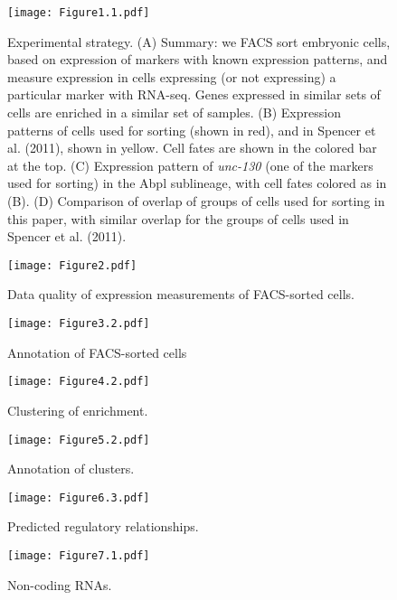 \documentclass{article}
\begin{document}

\begin{figure}
\texttt{[image: Figure1.1.pdf]}
\caption{Experimental strategy.
(A) Summary: we FACS sort embryonic cells, based on expression of markers with known expression patterns, and measure expression in cells expressing (or not expressing) a particular marker with RNA-seq. Genes expressed in similar sets of cells are enriched in a similar set of samples.
(B) Expression patterns of cells used for sorting (shown in red), and in Spencer et al. (2011), shown in yellow. Cell fates are shown in the colored bar at the
top.
(C) Expression pattern of {\em unc-130} (one of the markers used for sorting) in the Abpl sublineage, with cell fates colored as in (B).
(D) Comparison of overlap of groups of cells used for sorting in this paper, with similar overlap for the groups of cells used in Spencer et al. (2011).
}
\end{figure}
\clearpage

\begin{figure}
\texttt{[image: Figure2.pdf]}
\caption{
Data quality of expression measurements of FACS-sorted cells.
}
\end{figure}
\clearpage

\begin{figure}
\texttt{[image: Figure3.2.pdf]}
\caption{
Annotation of FACS-sorted cells
}
\end{figure}
\clearpage

\begin{figure}
\texttt{[image: Figure4.2.pdf]}
\caption{
Clustering of enrichment.
}
\end{figure}
\clearpage


\begin{figure}
\texttt{[image: Figure5.2.pdf]}
\caption{
Annotation of clusters.
}
\end{figure}
\clearpage


\begin{figure}
\texttt{[image: Figure6.3.pdf]}
\caption{
Predicted regulatory relationships.
}
\end{figure}
\clearpage


\begin{figure}
\texttt{[image: Figure7.1.pdf]}
\caption{
Non-coding RNAs.
}
\end{figure}
\clearpage
\end{document}
